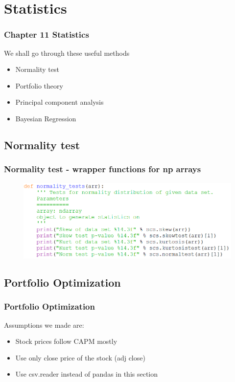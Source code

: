 \documentclass{beamer}
\begin{document}
\section{Statistics} %


\begin{frame}
\frametitle{Chapter 11 Statistics}
We shall go through these useful methods\\[4mm]
\begin{itemize}
	\item Normality test
	\item Portfolio theory
	\item Principal component analysis
	\item Bayesian Regression
\end{itemize}
\end{frame}

\subsection{Normality test}
\begin{frame}
\frametitle{Normality test - wrapper functions for np arrays}
\begin{figure}[H]
	\includegraphics[scale=0.5]{normality_test.png}
\end{figure}
\end{frame}

\subsection{Portfolio Optimization}

\begin{frame}
\frametitle{Portfolio Optimization}
Assumptions we made are:
\begin{itemize}
	\item Stock prices follow CAPM mostly
	\item Use only close price of the stock (adj close)
	\item Use csv.reader instead of pandas in this section
\end{itemize}
\end{frame}
\end{document}
